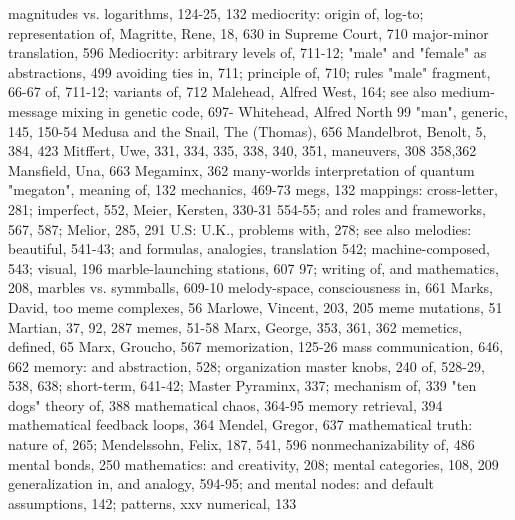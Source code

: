 magnitudes vs. logarithms, 124-25, 132           mediocrity: origin of, log-to; representation of,
Magritte, Rene, 18, 630                           in Supreme Court, 710
major-minor translation, 596                     Mediocrity: arbitrary levels of, 711-12;
"male" and "female" as abstractions, 499          avoiding ties in, 711; principle of, 710; rules
"male" fragment, 66-67                            of, 711-12; variants of, 712
Malehead, Alfred West, 164; see also             medium-message mixing in genetic code, 697-
 Whitehead, Alfred North                          99
"man", generic, 145, 150-54                      Medusa and the Snail, The (Thomas), 656
Mandelbrot, Benolt, 5, 384, 423                  Mitffert, Uwe, 331, 334, 335, 338, 340, 351,
maneuvers, 308                                    358,362
Mansfield, Una, 663                              Megaminx, 362
many-worlds interpretation of quantum            "megaton", meaning of, 132
 mechanics, 469-73                               megs, 132
mappings: cross-letter, 281; imperfect, 552,     Meier, Kersten, 330-31
 554-55; and roles and frameworks, 567, 587;     Melior, 285, 291
 U.S: U.K., problems with, 278; see also         melodies: beautiful, 541-43; and formulas,
 analogies, translation                           542; machine-composed, 543; visual, 196
marble-launching stations, 607                    97; writing of, and mathematics, 208,
marbles vs. symmballs, 609-10                    melody-space, consciousness in, 661
Marks, David, too                                meme complexes, 56
Marlowe, Vincent, 203, 205                       meme mutations, 51
Martian, 37, 92, 287                             memes, 51-58
Marx, George, 353, 361, 362                      memetics, defined, 65
Marx, Groucho, 567                               memorization, 125-26
mass communication, 646, 662                     memory: and abstraction, 528; organization
master knobs, 240                                 of, 528-29, 538, 638; short-term, 641-42;
Master Pyraminx, 337; mechanism of, 339           "ten dogs" theory of, 388
mathematical chaos, 364-95                       memory retrieval, 394
mathematical feedback loops, 364                 Mendel, Gregor, 637
mathematical truth: nature of, 265;              Mendelssohn, Felix, 187, 541, 596
nonmechanizability of, 486                       mental bonds, 250
mathematics: and creativity, 208;                mental categories, 108, 209
 generalization in, and analogy, 594-95; and     mental nodes: and default assumptions, 142;
 patterns, xxv                                   numerical, 133

